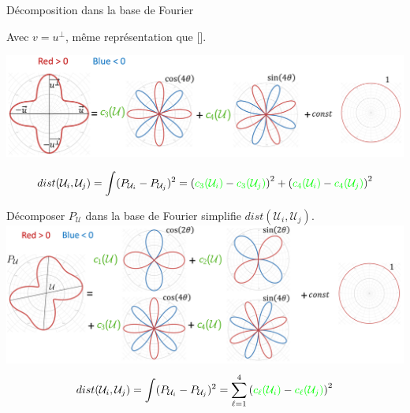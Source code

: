 \begin{frame}{Décomposition dans la base de Fourier}
    \centering
    \begin{overprint}
     \centering
    Avec $v = u^{\perp}$, même représentation que [\cite{palacios_rotational_2007}].
    
    \includegraphics[width=0.95\linewidth]{img_spm_ff/ortho_decomposition_with_circle.PNG}
    
    $$ dist(\mathcal{U}_i, \mathcal{U}_j) =  \int (P_{\mathcal{U}_i} - P_{\mathcal{U}_j})^2 =  \left({\color{green}c_3(\mathcal{U}_i)} - {\color{green}c_3(\mathcal{U}_j)} \right)^2 
    + \left({\color{green}c_4(\mathcal{U}_i)} - {\color{green}c_4(\mathcal{U}_j)} \right)^2$$
     \centering
    
    Décomposer $P_\mathcal{U}$ dans la base de Fourier simplifie $dist(\mathcal{U}_i, \mathcal{U}_j)$. \\
    \includegraphics[width=0.95\linewidth]{img_spm_ff/polynome_decomposition_with_circle.PNG}
    $$ dist(\mathcal{U}_i, \mathcal{U}_j) =  \int (P_{\mathcal{U}_i} - P_{\mathcal{U}_j})^2 = \sum_{\ell=1}^4 \left({\color{green}c_\ell(\mathcal{U}_i)} - {\color{green}c_\ell(\mathcal{U}_j)} \right)^2$$
    \end{overprint}
    
\end{frame} 

